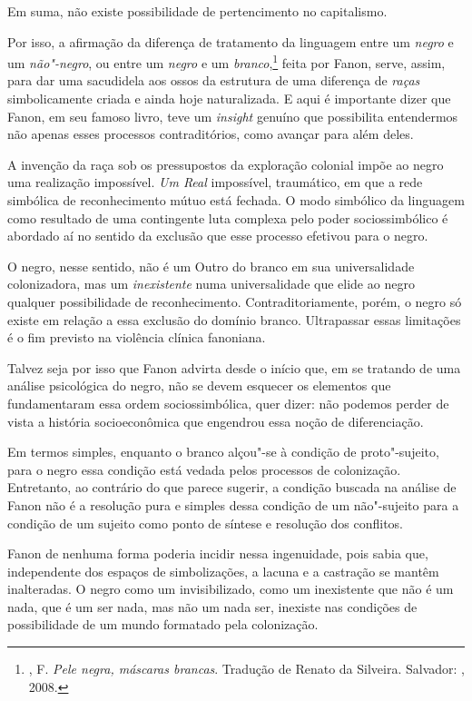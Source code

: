Em suma, não existe possibilidade de pertencimento no capitalismo.

Por isso, a afirmação da diferença de tratamento da linguagem entre um
\emph{negro} e um \emph{não"-negro}, ou entre um \emph{negro} e um
\emph{branco},\footnote{, F. \emph{Pele negra, máscaras brancas}.
  Tradução de Renato da Silveira. Salvador: , 2008.} feita por
Fanon, serve, assim, para dar uma sacudidela aos ossos da estrutura de
uma diferença de \emph{raças} simbolicamente criada e ainda hoje
naturalizada. E aqui é importante dizer que Fanon, em seu famoso livro,
teve um \emph{insight} genuíno que possibilita entendermos não apenas
esses processos contraditórios, como avançar para além deles.

A invenção da raça sob os pressupostos da exploração colonial impõe ao
negro uma realização impossível. \emph{Um Real} impossível, traumático,
em que a rede simbólica de reconhecimento mútuo está fechada. O modo
simbólico da linguagem como resultado de uma contingente luta complexa
pelo poder sociossimbólico é abordado aí no sentido da exclusão que esse
processo efetivou para o negro.

O negro, nesse sentido, não é um Outro do branco em sua universalidade
colonizadora, mas um \emph{inexistente} numa universalidade que elide ao
negro qualquer possibilidade de reconhecimento. Contraditoriamente,
porém, o negro só existe em relação a essa exclusão do domínio branco.
Ultrapassar essas limitações é o fim previsto na violência clínica
fanoniana.

Talvez seja por isso que Fanon advirta desde o início que, em se
tratando de uma análise psicológica do negro, não se devem esquecer os
elementos que fundamentaram essa ordem sociossimbólica, quer dizer: não
podemos perder de vista a história socioeconômica que engendrou essa
noção de diferenciação.

Em termos simples, enquanto o branco alçou"-se à condição de
proto"-sujeito, para o negro essa condição está vedada pelos processos de
colonização. Entretanto, ao contrário do que parece sugerir, a condição
buscada na análise de Fanon não é a resolução pura e simples dessa
condição de um não"-sujeito para a condição de um sujeito como ponto de
síntese e resolução dos conflitos.

Fanon de nenhuma forma poderia incidir nessa ingenuidade, pois sabia
que, independente dos espaços de simbolizações, a lacuna e a castração
se mantêm inalteradas. O negro como um invisibilizado, como um
inexistente que não é um nada, que é um ser nada, mas não um nada ser,
inexiste nas condições de possibilidade de um mundo formatado pela
colonização.


